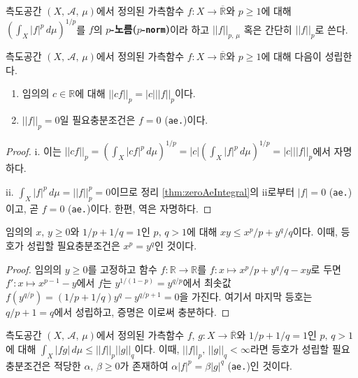 \begin{definition}
    측도공간 $(X,\,\mathcal{A},\,\mu)$에서 정의된 가측함수 $f:X\to\overline{\mathbb{R}}$와 $p\geq1$에 대해 $(\int_X|f|^p\,d\mu)^{1/p}$를 $f$의 \textbf{$p$-노름($p$-\texttt{norm})}이라 하고 $||f||_{p,\,\mu}$ 혹은 간단히 $||f||_p$로 쓴다.
\end{definition}

\begin{proposition}\label{prop:lpnormScale}
    측도공간 $(X,\,\mathcal{A},\,\mu)$에서 정의된 가측함수 $f:X\to\overline{\mathbb{R}}$와 $p\geq1$에 대해 다음이 성립한다.
    \begin{enumerate}
        \item 임의의 $c\in\mathbb{R}$에 대해 $||cf||_p=|c|||f||_p$이다.
        \item $||f||_p=0$일 필요충분조건은 $f=0$ (\texttt{ae.})이다.
    \end{enumerate}
\end{proposition}

\begin{proof}
    i. 이는 $||cf||_p=(\int_X|cf|^p\,d\mu)^{1/p}=|c|(\int_X|f|^p\,d\mu)^{1/p}=|c|||f||_p$에서 자명하다.

    ii. $\int_X|f|^p\,d\mu=||f||_p^p=0$이므로 정리 \ref{thm:zeroAeIntegral}의 ii로부터  $|f|=0$ (\texttt{ae.})이고, 곧 $f=0$ (\texttt{ae.})이다. 한편, 역은 자명하다.
\end{proof}

\begin{lemma}
    임의의 $x,\,y\geq0$와 $1/p+1/q=1$인 $p,\,q>1$에 대해 $xy\leq x^p/p+y^q/q$이다. 이때, 등호가 성립할 필요충분조건은 $x^p=y^q$인 것이다.
\end{lemma}

\begin{proof}
    임의의 $y\geq0$를 고정하고 함수 $f:\mathbb{R}\to\mathbb{R}$를 $f:x\mapsto x^p/p+y^q/q-xy$로 두면 $f':x\mapsto x^{p-1}-y$에서 $f$는 $y^{1/(1-p)}=y^{q/p}$에서 최솟값 $f(y^{q/p})=(1/p+1/q)y^q-y^{q/p+1}=0$을 가진다. 여기서 마지막 등호는 $q/p+1=q$에서 성립하고, 증명은 이로써 충분하다.
\end{proof}

\begin{theorem}
    측도공간 $(X,\,\mathcal{A},\,\mu)$에서 정의된 가측함수 $f,\,g:X\to\overline{\mathbb{R}}$와 $1/p+1/q=1$인 $p,\,q>1$에 대해 $\int_X|fg|\,d\mu\leq||f||_p||g||_q$이다. 이때, $||f||_p,\,||g||_q<\infty$라면 등호가 성립할 필요충분조건은 적당한 $\alpha,\,\beta\geq0$가 존재하여 $\alpha|f|^p=\beta|g|^q$ (\texttt{ae.})인 것이다.
\end{theorem}

